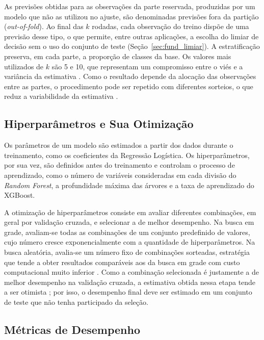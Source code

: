 As previsões obtidas para as observações da parte reservada, produzidas por um modelo que não as utilizou no ajuste, são denominadas previsões fora da partição (\textit{out-of-fold}). Ao final das $k$ rodadas, cada observação do treino dispõe de uma previsão desse tipo, o que permite, entre outras aplicações, a escolha do limiar de decisão sem o uso do conjunto de teste (Seção~\ref{sec:fund_limiar}). A estratificação preserva, em cada parte, a proporção de classes da base. Os valores mais utilizados de $k$ são 5 e 10, que representam um compromisso entre o viés e a variância da estimativa \cite{elementsofstatiscal}. Como o resultado depende da alocação das observações entre as partes, o procedimento pode ser repetido com diferentes sorteios, o que reduz a variabilidade da estimativa \cite{Kim2009Estimating}.

\subsection{Hiperparâmetros e Sua Otimização}
\label{sec:fund_hiperparametros}

Os parâmetros de um modelo são estimados a partir dos dados durante o treinamento, como os coeficientes da Regressão Logística. Os hiperparâmetros, por sua vez, são definidos antes do treinamento e controlam o processo de aprendizado, como o número de variáveis consideradas em cada divisão do \textit{Random Forest}, a profundidade máxima das árvores e a taxa de aprendizado do XGBoost.

A otimização de hiperparâmetros consiste em avaliar diferentes combinações, em geral por validação cruzada, e selecionar a de melhor desempenho. Na busca em grade, avaliam-se todas as combinações de um conjunto predefinido de valores, cujo número cresce exponencialmente com a quantidade de hiperparâmetros. Na busca aleatória, avalia-se um número fixo de combinações sorteadas, estratégia que tende a obter resultados comparáveis aos da busca em grade com custo computacional muito inferior \cite{Bergstra2012Random}. Como a combinação selecionada é justamente a de melhor desempenho na validação cruzada, a estimativa obtida nessa etapa tende a ser otimista \cite{Cawley2010OverFitting}; por isso, o desempenho final deve ser estimado em um conjunto de teste que não tenha participado da seleção.

\subsection{Métricas de Desempenho}
\label{sec:fund_metricas}
\label{sec:fund_matriz}

